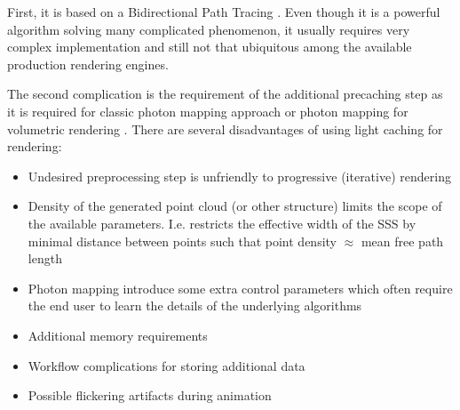 First, it is based on a Bidirectional Path Tracing
\cite{Lafortune:1996:RPM:275458.275468}. Even though it is a powerful algorithm solving many
complicated phenomenon, it usually requires very complex implementation and still not that
ubiquitous among the available production rendering engines. 

The second complication is the requirement of the additional precaching step as it is required for
classic photon mapping approach or photon mapping for volumetric rendering \cite{Jensen:1998:ESL:280814.280925}.
There are several disadvantages of using light caching for rendering:
\begin{itemize}
    \item{Undesired preprocessing step is unfriendly to progressive (iterative) rendering}
    \item{Density of the generated point cloud (or other structure) limits the scope of the
    available parameters. I.e. restricts the effective width of the SSS by minimal distance between
    points such that point density $\approx$ mean free path length}
    \item{Photon mapping introduce some extra control parameters which often require the end user to
    learn the details of the underlying algorithms}
    \item{Additional memory requirements}
    \item{Workflow complications for storing additional data}
    \item{Possible flickering artifacts during animation}
\end{itemize}
